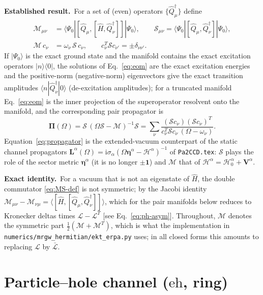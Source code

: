 \documentclass[aip,jcp,reprint,noshowkeys,superscriptaddress]{revtex4-1}
\newcommand{\bI}{\boldsymbol{1}}
\newcommand{\bPi}{\boldsymbol{\Pi}}
\newcommand{\bcalM}{\boldsymbol{\mathcal M}}
\newcommand{\bcalS}{\boldsymbol{\mathcal S}}
\newcommand{\ii}{\mathrm{i}}
\newcommand{\eh}{\text{eh}}
\newcommand{\Lag}{\mathcal{L}}
\newcommand{\sLag}{\bar{\mathcal L}}
\newcommand{\Exact}{\textbf{Exact identity.}\ }
\newcommand{\Established}{\textbf{Established result.}\ }
\begin{document}
\Established For a set of (even) operators $\{\hat Q_\mu^\dagger\}$ define
\begin{align}
  \mathcal M_{\mu\nu}&=\langle\Psi_0|[\hat Q_\mu,[\hat H,\hat Q_\nu^\dagger]]|\Psi_0\rangle ,
  \qquad
  \mathcal S_{\mu\nu}=\langle\Psi_0|[\hat Q_\mu,\hat Q_\nu^\dagger]|\Psi_0\rangle ,
  \label{eq:MS-def}\\
  \bcalM\,c_\nu&=\omega_\nu\,\bcalS\,c_\nu ,\qquad
  c_\nu^{T}\bcalS c_{\nu'}=\pm\delta_{\nu\nu'} .
  \label{eq:eom}
\end{align}
If $|\Psi_0\rangle$ is the exact ground state and the manifold contains the
exact excitation operators $|n\rangle\langle 0|$, the solutions of
Eq.~\eqref{eq:eom} are the exact excitation energies and the
positive-norm (negative-norm) eigenvectors give the exact transition amplitudes
$\langle n|\hat Q^\dagger_\nu|0\rangle$ (de-excitation amplitudes); for a
truncated manifold Eq.~\eqref{eq:eom} is the inner projection of the
superoperator resolvent onto the manifold, and the corresponding pair
propagator is
\begin{equation}
  \bPi(\Omega)=\bcalS\,(\Omega\bcalS-\bcalM)^{-1}\bcalS
  =\sum_{\nu}\frac{(\bcalS c_\nu)(\bcalS c_\nu)^{T}}{c_\nu^{T}\bcalS c_\nu\,(\Omega-\omega_\nu)} .
  \label{eq:propagator}
\end{equation}
Equation~\eqref{eq:propagator} is the extended-vacuum counterpart of the static
channel propagators
$\boldsymbol L^{\alpha}(\Omega)=\ii\sigma_\alpha(\Omega\boldsymbol\eta^{\alpha}-\boldsymbol{\mathcal H}^{\alpha})^{-1}$
of \texttt{Pa2CCD.tex}: $\bcalS$ plays the role of the sector metric
$\boldsymbol\eta^\alpha$ (it is no longer $\pm\bI$) and $\bcalM$ that of
$\boldsymbol{\mathcal H}^\alpha=\boldsymbol{\mathcal H}^\alpha_0+\boldsymbol V^\alpha$.

\Exact For a vacuum that is not an eigenstate of $\hat H$, the double
commutator \eqref{eq:MS-def} is not symmetric; by the Jacobi identity
$\mathcal M_{\mu\nu}-\mathcal M_{\nu\mu}=\langle[\hat H,[\hat Q_\mu,\hat Q^\dagger_\nu]]\rangle$,
which for the pair manifolds below reduces to Kronecker deltas times
$\Lag-\Lag^{T}$ [see Eq.~\eqref{eq:ph-asym}].  Throughout, $\bcalM$ denotes the
symmetric part $\tfrac12(\bcalM+\bcalM^{T})$, which is what the implementation
in \texttt{numerics/mrgw\_hermitian/ekt\_erpa.py} uses; in all closed forms this
amounts to replacing $\Lag$ by $\sLag$.

\section{Particle--hole channel (\texorpdfstring{$\eh$}{eh}, ring)}
\label{sec:ph}
\end{document}

